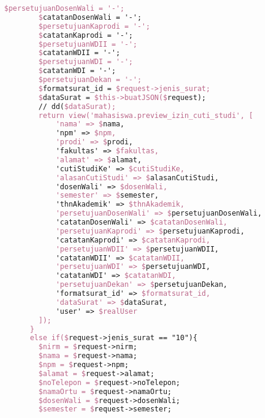 \begin{lstlisting}[language=tex,basicstyle=\tiny,caption=PesanansuratController.php]
        $persetujuanDosenWali = '-';
        $catatanDosenWali = '-';
        $persetujuanKaprodi = '-';
        $catatanKaprodi = '-';
        $persetujuanWDII = '-';
        $catatanWDII = '-';
        $persetujuanWDI = '-';
        $catatanWDI = '-';
        $persetujuanDekan = '-';
        $formatsurat_id = $request->jenis_surat;
        $dataSurat = $this->buatJSON($request);
        // dd($dataSurat);
        return view('mahasiswa.preview_izin_cuti_studi', [
            'nama' => $nama,
            'npm' => $npm,
            'prodi' => $prodi,
            'fakultas' => $fakultas,
            'alamat' => $alamat,
            'cutiStudiKe' => $cutiStudiKe,
            'alasanCutiStudi' => $alasanCutiStudi,
            'dosenWali' => $dosenWali,
            'semester' => $semester,
            'thnAkademik' => $thnAkademik,
            'persetujuanDosenWali' => $persetujuanDosenWali,
            'catatanDosenWali' => $catatanDosenWali,
            'persetujuanKaprodi' => $persetujuanKaprodi,
            'catatanKaprodi' => $catatanKaprodi,
            'persetujuanWDII' => $persetujuanWDII,
            'catatanWDII' => $catatanWDII,
            'persetujuanWDI' => $persetujuanWDI,
            'catatanWDI' => $catatanWDI,
            'persetujuanDekan' => $persetujuanDekan,
            'formatsurat_id' => $formatsurat_id,
            'dataSurat' => $dataSurat,
            'user' => $realUser
        ]);
      }
      else if($request->jenis_surat == "10"){
        $nirm = $request->nirm;
        $nama = $request->nama;
        $npm = $request->npm;
        $alamat = $request->alamat;
        $noTelepon = $request->noTelepon;
        $namaOrtu = $request->namaOrtu;
        $dosenWali = $request->dosenWali;
        $semester = $request->semester;
        

\end{lstlisting}

